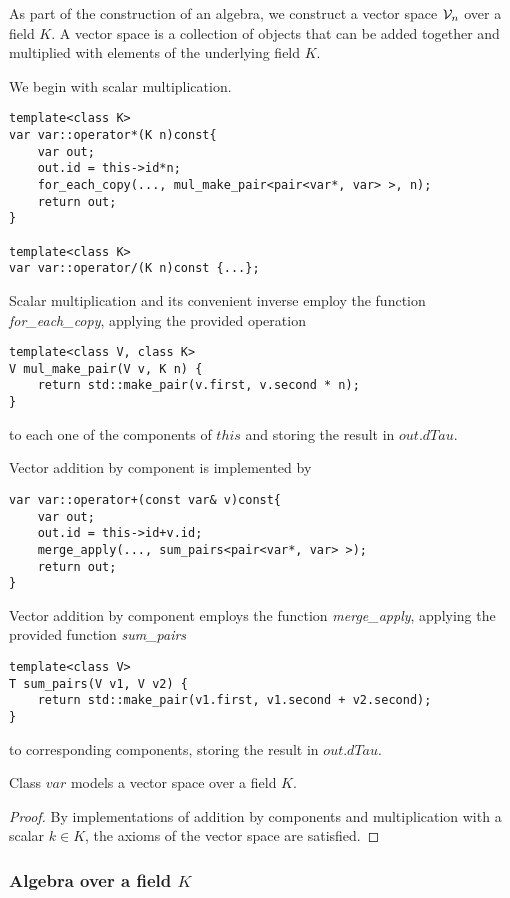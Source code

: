 As part of the construction of an algebra, we construct a vector space $\mathcal{V}_n$ over a field $K$. A vector space is a collection of objects that can be added together and multiplied with elements of the underlying field $K$.

We begin with scalar multiplication.

\begin{lstlisting}
template<class K>
var var::operator*(K n)const{
    var out;
    out.id = this->id*n;
    for_each_copy(..., mul_make_pair<pair<var*, var> >, n);
    return out;
}

template<class K>
var var::operator/(K n)const {...};
\end{lstlisting}
Scalar multiplication and its convenient inverse employ the function \emph{for\_each\_copy}, applying the provided operation 
\begin{lstlisting}
template<class V, class K>
V mul_make_pair(V v, K n) {
    return std::make_pair(v.first, v.second * n);
}
\end{lstlisting}
to each one of the components of $this$ and storing the result in $out.dTau$.

Vector addition by component is implemented by 
\begin{lstlisting}
var var::operator+(const var& v)const{
    var out;
    out.id = this->id+v.id;
    merge_apply(..., sum_pairs<pair<var*, var> >);
    return out;
}
\end{lstlisting}
Vector addition by component employs the function \emph{merge\_apply}, applying the provided function \emph{sum\_pairs}
\begin{lstlisting}
template<class V>
T sum_pairs(V v1, V v2) {
    return std::make_pair(v1.first, v1.second + v2.second);
}
\end{lstlisting}
to corresponding components, storing the result in $out.dTau$.

\begin{theorem}
Class $var$ models a vector space over a field $K$.
\end{theorem}
\begin{proof}
By implementations of addition by components and multiplication with a scalar $k\in K$, the axioms of the vector space are satisfied.
\end{proof}

\subsubsection{Algebra over a field $K$}\label{sec:algebra}

